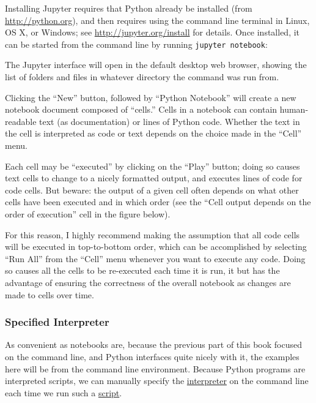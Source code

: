 \documentclass[
]{memoir}
\begin{document}
Installing Jupyter requires that Python already be installed (from \url{http://python.org}), and then requires using the command line terminal in Linux, OS X, or Windows; see \href{http://python.org/install}{http://jupyter.org/install} for details. Once installed, it can be started from the command line by running \texttt{jupyter\ notebook}:

The Jupyter interface will open in the default desktop web browser, showing the list of folders and files in whatever directory the command was run from.

Clicking the \enquote{New} button, followed by \enquote{Python Notebook} will create a new notebook document composed of \enquote{cells.} Cells in a notebook can contain human-readable text (as documentation) or lines of Python code. Whether the text in the cell is interpreted as code or text depends on the choice made in the \enquote{Cell} menu.

Each cell may be \enquote{executed} by clicking on the \enquote{Play} button; doing so causes text cells to change to a nicely formatted output, and executes lines of code for code cells. But beware: the output of a given cell often depends on what other cells have been executed and in which order (see the \enquote{Cell output depends on the order of execution} cell in the figure below).

For this reason, I highly recommend making the assumption that all code cells will be executed in top-to-bottom order, which can be accomplished by selecting \enquote{Run All} from the \enquote{Cell} menu whenever you want to execute any code. Doing so causes all the cells to be re-executed each time it is run, it but has the advantage of ensuring the correctness of the overall notebook as changes are made to cells over time.

\hypertarget{specified-interpreter}{%
\subsubsection*{Specified Interpreter}\label{specified-interpreter}}

As convenient as notebooks are, because the previous part of this book focused on the command line, and Python interfaces quite nicely with it, the examples here will be from the command line environment. Because Python programs are interpreted scripts, we can manually specify the \protect\hyperlink{interpreter_def}{interpreter} on the command line each time we run such a \protect\hyperlink{script_def}{script}.
\end{document}
